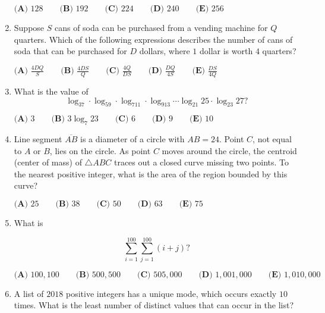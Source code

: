 \documentclass{article}
\begin{document}
\begin{enumerate}[label=\arabic*., itemsep=0.5em]
\(
\textbf{(A) } 128 \qquad
\textbf{(B) } 192 \qquad
\textbf{(C) } 224 \qquad
\textbf{(D) } 240 \qquad
\textbf{(E) } 256
\)\par \vspace{0.5em}\item Suppose \(S\) cans of soda can be purchased from a vending machine for \(Q\) quarters. Which of the following expressions describes the number of cans of soda that can be purchased for \(D\) dollars, where \(1\) dollar is worth \(4\) quarters?

\(\textbf{(A) } \frac{4DQ}{S} \qquad \textbf{(B) } \frac{4DS}{Q} \qquad \textbf{(C) } \frac{4Q}{DS} \qquad \textbf{(D) } \frac{DQ}{4S} \qquad \textbf{(E) } \frac{DS}{4Q}\)\par \vspace{0.5em}\item What is the value of 
\begin{equation*}
\log_37\cdot\log_59\cdot\log_711\cdot\log_913\cdots\log_{21}25\cdot\log_{23}27?
\end{equation*}

\(\textbf{(A) } 3 \qquad \textbf{(B) } 3\log_{7}23 \qquad \textbf{(C) } 6 \qquad \textbf{(D) } 9 \qquad \textbf{(E) } 10 \)\par \vspace{0.5em}\item Line segment \(\overline{AB}\) is a diameter of a circle with \(AB = 24\). Point \(C\), not equal to \(A\) or \(B\), lies on the circle. As point \(C\) moves around the circle, the centroid (center of mass) of \(\triangle ABC\) traces out a closed curve missing two points. To the nearest positive integer, what is the area of the region bounded by this curve?

\(\textbf{(A) } 25 \qquad \textbf{(B) } 38  \qquad \textbf{(C) } 50  \qquad \textbf{(D) } 63 \qquad \textbf{(E) } 75  \)\par \vspace{0.5em}\item What is

\begin{equation*}
\sum^{100}_{i=1} \sum^{100}_{j=1} (i+j) ?
\end{equation*}


\( \textbf{(A) }100{,}100 \qquad
\textbf{(B) }500{,}500\qquad
\textbf{(C) }505{,}000 \qquad
\textbf{(D) }1{,}001{,}000 \qquad
\textbf{(E) }1{,}010{,}000 \qquad \)\par \vspace{0.5em}\item A list of \(2018\) positive integers has a unique mode, which occurs exactly \(10\) times. What is the least number of distinct values that can occur in the list?


\end{enumerate}
\end{document}
